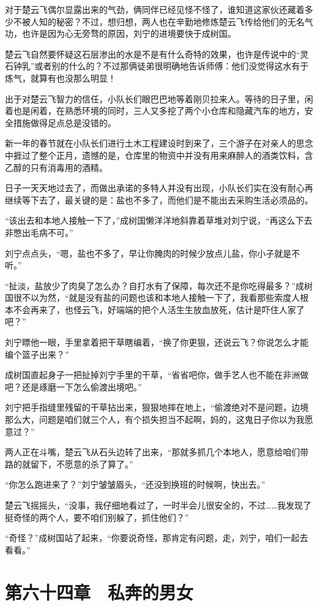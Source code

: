 对于楚云飞偶尔显露出来的气劲，俩同伴已经见怪不怪了，谁知道这家伙还藏着多少不被人知的秘密？不过，想归想，两人也在辛勤地修炼楚云飞传给他们的无名气功，也许是因为心无旁骛的原因，刘宁的进境要快于成树国。

楚云飞自然要怀疑这石层渗出的水是不是有什么奇特的效果，也许是传说中的“灵石钟乳”或者别的什么的？不过那俩徒弟很明确地告诉师傅：他们没觉得这水有于炼气，就算有也没那么明显！

出于对楚云飞智力的信任，小队长们眼巴巴地等着刚贝拉来人。等待的日子里，闲着也是闲着，在熟悉环境的同时，三人又多挖了两个小仓库和隐藏汽车的地方，安全措施做得足点总是没错的。

新一年的春节就在小队长们进行土木工程建设时到来了，三个游子在对亲人的思念中捱过了整个正月，遗憾的是，仓库里的物资中并没有用来麻醉人的酒类饮料，含乙醇的只有消毒用的酒精。

日子一天天地过去了，而做出承诺的多特人并没有出现，小队长们实在没有耐心再继续等下去了，最关键的是：盐也不多了，而他们是不能出去采购生活必须品的。

“该出去和本地人接触一下了，”成树国懒洋洋地斜靠着草堆对刘宁说，“再这么下去非憋出毛病不可。”

刘宁点点头，“嗯，盐也不多了，早让你腌肉的时候少放点儿盐，你小子就是不听。”

“扯淡，盐放少了肉臭了怎么办？自打水有了保障，每次还不是你吃得最多？”成树国很不以为然，“就是没有盐的问题也该和本地人接触一下了，我看那些索度人根本不会再来了，也怪云飞，好端端的把个人活生生放血放死，估计是吓住人家了吧？”

刘宁瞟他一眼，手里拿着把干草瞎编着，“换了你更狠，还说云飞？你说怎么才能编个篮子出来？”

成树国直起身子一把扯掉刘宁手里的干草，“省省吧你，做手艺人也不能在非洲做吧？还是琢磨一下怎么偷渡出境吧。”

刘宁把手指缝里残留的干草拈出来，狠狠地摔在地上，“偷渡绝对不是问题，边境那么大，问题是咱们就三个人，有个损失担当不起啊，妈的，这鬼日子你以为我愿意过？”

两人正在斗嘴，楚云飞从石头边转了出来，“那就多抓几个本地人，愿意给咱们带路的就留下，不愿意的杀了算了。”

“你怎么跑进来了？”刘宁皱皱眉头，“还没到换班的时候啊，快出去。”

楚云飞摇摇头，“没事，我仔细地看过了，一时半会儿很安全的，不过……我发现了挺奇怪的两个人，要不咱们别躲了，抓住他们？”

“奇怪？”成树国站了起来，“你要说奇怪，那肯定有问题，走，刘宁，咱们一起去看看。”

\section{第六十四章　私奔的男女}

